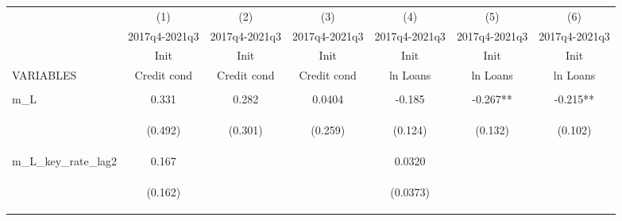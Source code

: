 \documentclass[]{article}
\begin{document}
\begin{center}
\begin{tabular}{lcccccc} \hline
 & (1) & (2) & (3) & (4) & (5) & (6) \\
 & 2017q4-2021q3 & 2017q4-2021q3 & 2017q4-2021q3 & 2017q4-2021q3 & 2017q4-2021q3 & 2017q4-2021q3 \\
 & Init & Init & Init & Init & Init & Init \\
VARIABLES & Credit cond & Credit cond & Credit cond & ln Loans & ln Loans & ln Loans \\ \hline
\vspace{4pt} & \begin{footnotesize}\end{footnotesize} & \begin{footnotesize}\end{footnotesize} & \begin{footnotesize}\end{footnotesize} & \begin{footnotesize}\end{footnotesize} & \begin{footnotesize}\end{footnotesize} & \begin{footnotesize}\end{footnotesize} \\
m\_L & 0.331 & 0.282 & 0.0404 & -0.185 & -0.267** & -0.215** \\
\vspace{4pt} & \begin{footnotesize}(0.492)\end{footnotesize} & \begin{footnotesize}(0.301)\end{footnotesize} & \begin{footnotesize}(0.259)\end{footnotesize} & \begin{footnotesize}(0.124)\end{footnotesize} & \begin{footnotesize}(0.132)\end{footnotesize} & \begin{footnotesize}(0.102)\end{footnotesize} \\
m\_L\_key\_rate\_lag2 & 0.167 &  &  & 0.0320 &  &  \\
\vspace{4pt} & \begin{footnotesize}(0.162)\end{footnotesize} & \begin{footnotesize}\end{footnotesize} & \begin{footnotesize}\end{footnotesize} & \begin{footnotesize}(0.0373)\end{footnotesize} & \begin{footnotesize}\end{footnotesize} & \begin{footnotesize}\end{footnotesize} \\

\end{tabular}
\end{center}
\end{document}
